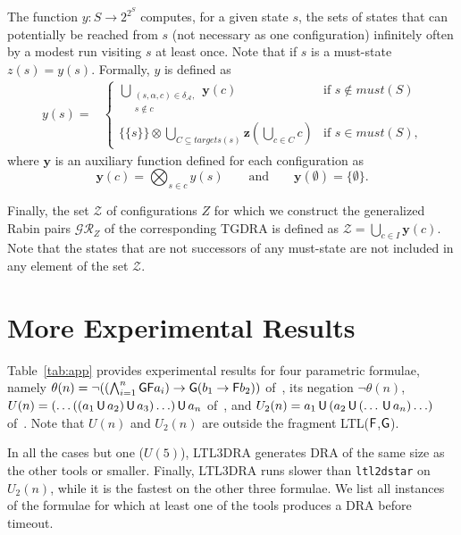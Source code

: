 \documentclass{llncs}
\newcommand{\mA}{\mathcal{A}}
\newcommand{\mGR}{\mathcal{GR}}
\newcommand{\mT}{\mathcal{T}}
\newcommand{\mZ}{\mathcal{Z}}
\newcommand{\A}{_{\mA}}			\newcommand{\T}{_{\mT}}
\newcommand{\must}{\mathit{must}}
\newcommand{\targets}{\mathit{targets}}
\begin{document}
The function $y : S \rightarrow 2^{2^S}$ computes, for a given state $s$,
the sets of states that can potentially be reached from $s$ (not necessary
as one configuration) infinitely often by a modest run visiting $s$ at least
once.  Note that if $s$ is a must-state $z(s)=y(s)$.  Formally, $y$ is defined as
\begin{align*}
  y(s) = &\begin{cases}
   \bigcup_{\substack{(s,\alpha,c) \in \delta\A, \\ s \notin c}} \mathbf{y}(c) & 
   \text{if } s \notin \must(S) \\[3ex]
   \{\{s\}\} \otimes \bigcup_{C \subseteq {\targets(s)}}  \mathbf{z}(\bigcup\limits_{c 
   \in C} c)      & \text{if } s \in \must(S)\text{,}
  \end{cases}
\end{align*}
where $\mathbf{y}$ is an auxiliary function defined for each configuration
as
\[
\mathbf{y}(c) = \textstyle \bigotimes_{s \in c} y(s)
\qquad\textrm{and}\qquad
\mathbf{y}(\emptyset) = \{\emptyset\}.
\]

Finally, the set $\mZ$ of configurations $Z$ for which we construct the
generalized Rabin pairs $\mGR_Z$ of the corresponding TGDRA is defined as
$\mZ = \textstyle \bigcup_{c \in I} \mathbf{y}(c)$.
Note that the states that are not successors of any must-state are not
included in any element of the set $\mZ$.



\section{More Experimental Results}\label{sec:moreexp}


Table~\ref{tab:app} provides experimental results for four parametric
formulae, namely $\theta(n)=\neg ((\bigwedge_{i=1}^n\mathsf{G}\mathsf{F} a_{i})\rightarrow
\mathsf{G} (b_1 \rightarrow \mathsf{F} b_2))$ of~\cite{GO01}, its negation
$\neg\theta(n)$, $U(n)=(\ldots((a_1 {\,\mathsf{U}\,} a_2) {\,\mathsf{U}\,} a_3) \ldots ) {\,\mathsf{U}\,} a_n$ of~\cite{GH06}, and
$U_2(n)=a_1 {\,\mathsf{U}\,} (a_2 {\,\mathsf{U}\,} ( \ldots {\,\mathsf{U}\,} a_n)\ldots)$ of~\cite{GH06}. Note that
$U(n)$ and $U_2(n)$ are outside the fragment LTL($\mathsf{F}$,$\mathsf{G}$).


In all the cases but one ($U(5)$), LTL3DRA generates DRA of the same size as
the other tools or smaller.  Finally, LTL3DRA runs slower than
\texttt{ltl2dstar} on $U_2(n)$, while it is the fastest on the other three
formulae.  We list all instances of the formulae for which at least one of
the tools produces a DRA before timeout.
\end{document}

